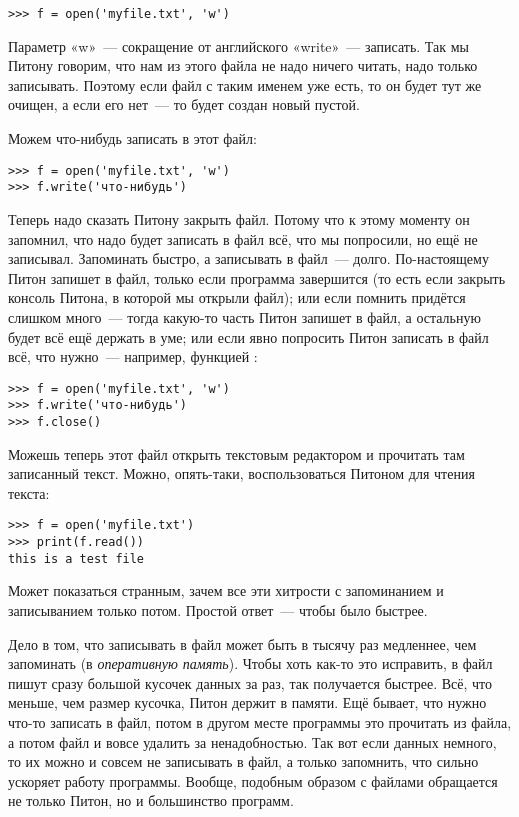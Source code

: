 \begin{listing}
\begin{verbatim}
>>> f = open('myfile.txt', 'w')
\end{verbatim}
\end{listing}

Параметр «w» — сокращение от английского «write» — записать. Так мы Питону говорим, что нам из этого файла не надо ничего читать, надо только записывать. Поэтому если файл с таким именем уже есть, то он будет тут же очищен, а если его нет — то будет создан новый пустой.

Можем что-нибудь записать в этот файл:

\begin{listing}
\begin{verbatim}
>>> f = open('myfile.txt', 'w')
>>> f.write('что-нибудь')
\end{verbatim}
\end{listing}

Теперь надо сказать Питону закрыть файл. Потому что к этому моменту он запомнил, что надо будет записать в файл  всё, что мы попросили, но ещё не записывал. Запоминать быстро, а записывать в файл — долго. По-настоящему Питон запишет в файл, только если программа завершится (то есть если закрыть консоль Питона, в которой мы открыли файл); или если помнить придётся слишком много — тогда какую-то часть Питон запишет в файл, а остальную будет всё ещё держать в уме; или если явно попросить Питон записать в файл всё, что нужно — например, функцией :

\begin{listing}
\begin{verbatim}
>>> f = open('myfile.txt', 'w')
>>> f.write('что-нибудь')
>>> f.close()
\end{verbatim}
\end{listing}

Можешь теперь этот файл открыть текстовым редактором и прочитать там записанный текст. Можно, опять-таки, воспользоваться Питоном для чтения текста:

\begin{listing}
\begin{verbatim}
>>> f = open('myfile.txt')
>>> print(f.read())
this is a test file
\end{verbatim}
\end{listing}

Может показаться странным, зачем все эти хитрости с запоминанием и записыванием только потом. Простой ответ — чтобы было быстрее.

Дело в том, что записывать в файл может быть в тысячу раз медленнее, чем запоминать (в \emph{оперативную память}). Чтобы хоть как-то это исправить, в файл пишут сразу большой кусочек данных за раз, так получается быстрее. Всё, что меньше, чем размер кусочка, Питон держит в памяти. Ещё бывает, что нужно что-то записать в файл, потом в другом месте программы это прочитать из файла, а потом файл и вовсе удалить за ненадобностью. Так вот если данных немного, то их можно и совсем не записывать в файл, а только запомнить, что сильно ускоряет работу программы. Вообще, подобным образом с файлами обращается не только Питон, но и большинство программ.

\newpage